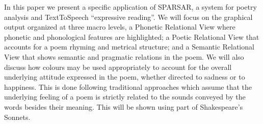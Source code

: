 In this paper we present a specific application of SPARSAR, a system for poetry analysis and TextToSpeech ``expressive reading''. We will focus on the graphical output organized at three macro levels, a Phonetic Relational View where phonetic and phonological features are highlighted; a Poetic Relational View that accounts for a poem rhyming and metrical structure; and a Semantic Relational View that shows semantic and pragmatic relations in the poem. We will also discuss how colours may be used appropriately to account for the overall underlying attitude expressed in the poem, whether directed to sadness or to happiness. This is done following traditional approaches which assume that the underlying feeling of a poem is strictly related to the sounds conveyed by the words besides their meaning. This will be shown using part of Shakespeare's Sonnets.
